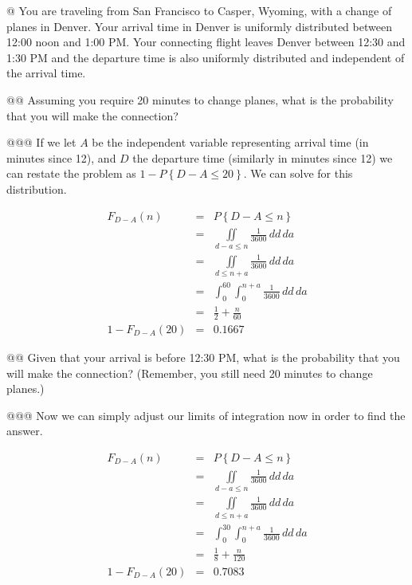 \documentclass[11pt]{article}\usepackage[]{graphicx}\usepackage[]{xcolor}
\begin{document}
\begin{easylist}[enumerate]
    @ You are traveling from San Francisco to Casper, Wyoming, with a change of planes in Denver.  Your arrival time in
    Denver is uniformly distributed between 12:00 noon and 1:00 PM. Your connecting flight leaves Denver between 12:30
    and 1:30 PM and the departure time is also uniformly distributed and independent of the arrival time.

    @@ Assuming you require 20 minutes to change planes, what is the probability that you will make the connection?

    @@@ If we let $A$ be the independent variable representing arrival time (in minutes since 12), and $D$ the departure
    time (similarly in minutes since 12) we can restate the problem as $1 - P\left\{ D - A \le 20 \right\}$. We can
    solve for this distribution.

    \begin{equation}
        \begin{aligned}
            F_{D-A}(n) &=& P\left\{ D - A \le n \right\}\\
                       &=& \iint\limits_{d - a \le n} \frac{1}{3600} \, dd \, da\\
                       &=& \iint\limits_{d \le n + a} \frac{1}{3600} \, dd \, da\\
                       &=& \int_0^{60} \int_0^{n+a} \frac{1}{3600} \, dd \, da\\
                       &=& \frac{1}{2} + \frac{n}{60}\\
       1 - F_{D-A}(20) &=& 0.1667
        \end{aligned}
    \end{equation}

    @@ Given that your arrival is before 12:30 PM, what is the probability that you will make the connection? (Remember,
    you still need 20 minutes to change planes.)

    @@@ Now we can simply adjust our limits of integration now in order to find the answer.

    \begin{equation}
        \begin{aligned}
            F_{D-A}(n) &=& P\left\{ D - A \le n \right\}\\
                       &=& \iint\limits_{d - a \le n} \frac{1}{3600} \, dd \, da\\
                       &=& \iint\limits_{d \le n + a} \frac{1}{3600} \, dd \, da\\
                       &=& \int_0^{30} \int_0^{n+a} \frac{1}{3600} \, dd \, da\\
                       &=& \frac{1}{8} + \frac{n}{120}\\
       1 - F_{D-A}(20) &=& 0.7083
        \end{aligned}
    \end{equation}


\end{easylist}
\end{document}
